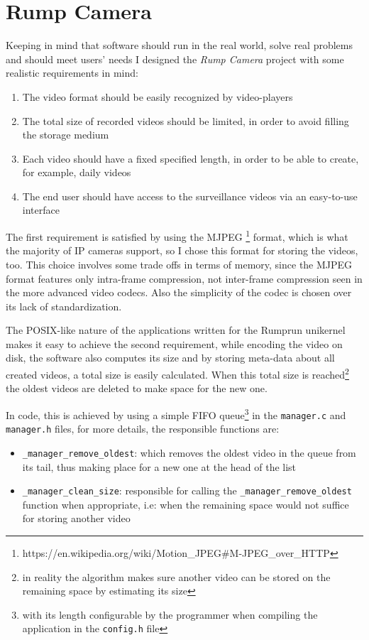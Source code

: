 \documentclass[10pt,a4paper,twoside]{article}
\begin{document}
\section{Rump Camera}
Keeping in mind that software should run in the real world, solve real problems and should meet users'
 needs I designed the \textit{Rump Camera} project with some realistic requirements in mind:

\begin{enumerate}
\item The video format should be easily recognized by video-players
\item The total size of recorded videos should be limited, in order to avoid filling the storage medium
\item Each video should have a fixed specified length, in order to be able to create, for example, daily videos
\item The end user should have access to the surveillance videos via an easy-to-use interface
\end{enumerate}

The first requirement is satisfied by using the MJPEG
\footnote{https://en.wikipedia.org/wiki/Motion\_JPEG\#M-JPEG\_over\_HTTP} format,
which is what the majority of IP cameras support, so I chose this format
for storing the videos, too. This choice involves some trade offs in terms of memory,
since the MJPEG format features only intra-frame compression, not inter-frame compression seen
in the more advanced video codecs. Also the simplicity of the codec is chosen over its lack of standardization.

The POSIX-like nature of the applications written for the Rumprun unikernel makes it
easy to achieve the second requirement, while encoding the video on disk, the software also computes its
size and by storing meta-data about all created videos, a total size is easily calculated.
When this total size is reached\footnote{in reality the algorithm makes sure another video can be stored on
the remaining space by estimating its size} the oldest videos are deleted to make space for the new one.

In code, this is achieved by using a simple FIFO queue\footnote{with its length configurable by the
programmer when compiling the application in the \texttt{config.h} file} in the
\texttt{manager.c} and \texttt{manager.h} files, for more details, the responsible functions are:

\begin{itemize}
\item \texttt{\_manager\_remove\_oldest}: which removes the oldest video in the queue from its tail,
thus making place for a new one at the head of the list
\item \texttt{\_manager\_clean\_size}: responsible for calling the \texttt{\_manager\_remove\_oldest} function
when appropriate, i.e: when the remaining space would not suffice for storing another video
\end{itemize}
\end{document}
